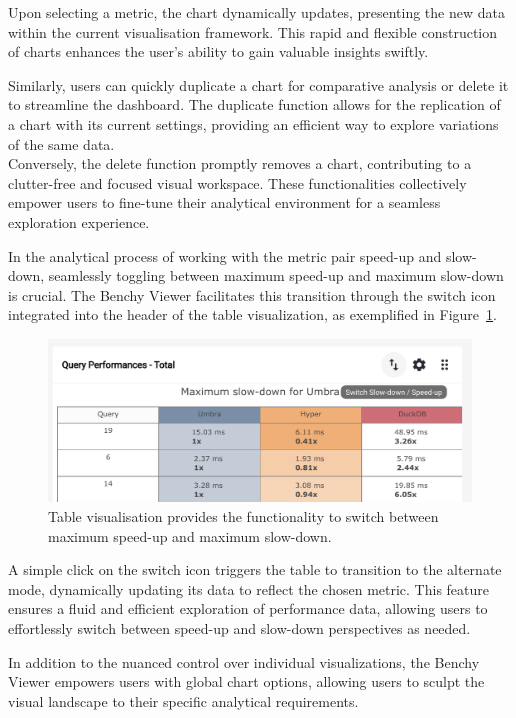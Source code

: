 Upon selecting a metric, the chart dynamically updates, presenting the new data within the current visualisation framework. This rapid and flexible construction of charts enhances the user's ability to gain valuable insights swiftly.

Similarly, users can quickly duplicate a chart for comparative analysis or delete it to streamline the dashboard. The duplicate function allows for the replication of a chart with its current settings, providing an efficient way to explore variations of the same data.\\
Conversely, the delete function promptly removes a chart, contributing to a clutter-free and focused visual workspace. These functionalities collectively empower users to fine-tune their analytical environment for a seamless exploration experience.

In the analytical process of working with the metric pair speed-up and slow-down, seamlessly toggling between maximum speed-up and maximum slow-down is crucial. The Benchy Viewer facilitates this transition through the switch icon integrated into the header of the table visualization, as exemplified in Figure~\ref{fig:chart-configuration-table-switch}.

\begin{figure}[h]
  \centering
  \includegraphics[width=0.8\linewidth]{figures/chart-configuration-table-switch.png}
  \caption{Table visualisation provides the functionality to switch between maximum speed-up and maximum slow-down.}
  \label{fig:chart-configuration-table-switch}
\end{figure}

A simple click on the switch icon triggers the table to transition to the alternate mode, dynamically updating its data to reflect the chosen metric. This feature ensures a fluid and efficient exploration of performance data, allowing users to effortlessly switch between speed-up and slow-down perspectives as needed.


In addition to the nuanced control over individual visualizations, the Benchy Viewer empowers users with global chart options, allowing users to sculpt the visual landscape to their specific analytical requirements.

